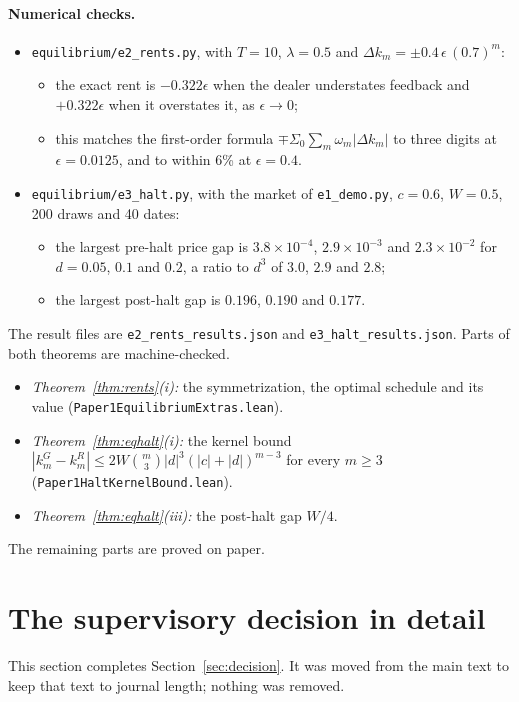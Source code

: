 \documentclass[12pt]{article}
\theoremstyle{definition}
\theoremstyle{remark}
\begin{document}
\paragraph{Numerical checks.}
\begin{itemize}[itemsep=1pt,topsep=2pt]
\item \nolinkurl{equilibrium/e2_rents.py}, with $T=10$, $\lambda=0.5$ and $\Delta k_m=\pm0.4\,\epsilon\,(0.7)^m$:
  \begin{itemize}[itemsep=1pt,topsep=1pt]
  \item the exact rent is $-0.322\epsilon$ when the dealer understates feedback and $+0.322\epsilon$ when it overstates it, as $\epsilon\to0$;
  \item this matches the first-order formula $\mp\Sigma_0\sum_m\omega_m|\Delta k_m|$ to three digits at $\epsilon=0.0125$, and to within 6\% at $\epsilon=0.4$.
  \end{itemize}
\item \nolinkurl{equilibrium/e3_halt.py}, with the market of \nolinkurl{e1_demo.py}, $c=0.6$, $W=0.5$, 200 draws and 40 dates:
  \begin{itemize}[itemsep=1pt,topsep=1pt]
  \item the largest pre-halt price gap is $3.8\times10^{-4}$, $2.9\times10^{-3}$ and $2.3\times10^{-2}$ for $d=0.05$, $0.1$ and $0.2$, a ratio to $d^3$ of $3.0$, $2.9$ and $2.8$;
  \item the largest post-halt gap is $0.196$, $0.190$ and $0.177$.
  \end{itemize}
\end{itemize}
The result files are \nolinkurl{e2_rents_results.json} and \nolinkurl{e3_halt_results.json}. Parts of both theorems are machine-checked.
\begin{itemize}[itemsep=1pt,topsep=2pt]
\item \emph{Theorem~\ref{thm:rents}(i):} the symmetrization, the optimal schedule and its value (\nolinkurl{Paper1EquilibriumExtras.lean}).
\item \emph{Theorem~\ref{thm:eqhalt}(i):} the kernel bound $|k^G_m-k^R_m|\le2W\binom m3|d|^3(|c|+|d|)^{m-3}$ for every $m\ge3$ (\nolinkurl{Paper1HaltKernelBound.lean}).
\item \emph{Theorem~\ref{thm:eqhalt}(iii):} the post-halt gap $W/4$.
\end{itemize}
The remaining parts are proved on paper.



\section{The supervisory decision in detail}\label{app:decisionfull}
This section completes Section~\ref{sec:decision}. It was moved from the main text to keep that text to journal length; nothing was removed.
\end{document}
